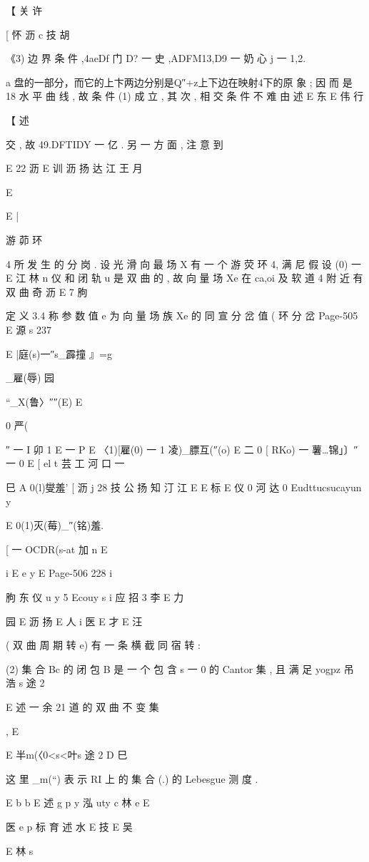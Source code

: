 {{{{{{【 关 许

[ 怀 沥 c 技 胡

《3) 边 界 条 件 ,4aeDf 门 D? 一 史 ,ADFM13,D9 一 奶 心 j 一 1,2.

a
盘的一部分，而它的上卞两边分别是Q″+z上下边在映射4下的原
象 ; 因 而 是 18 水 平 曲 线 , 故 条 件 (1) 成 立 , 其 次 , 相 交 条 件 不 难 由 述
E 东 E 伟 行

【 述

交 , 故 49.DFTIDY 一 亿 . 另 一 方 面 , 注 意 到

E 22 沥
E 训 沥 扬 达 江 王 月

E

E |

游 茆 环

4
所 发 生 的 分 岗 . 设 光 滑 向 最 场 X 有 一 个 游 荧 环 4, 满 尼 假 设 (0) 一
E 江 林 n 仪
和 闭 轨 u 是 双 曲 的 , 故 向 量 场 Xe 在 ca,oi 及 软 道 4 附 近 有 双 曲 奇
沥
E 7 朐

定 义 3.4 称 参 数 值 e 为 向 量 场 族 Xe 的 同 宣 分 岔 值 ( 环 分 岔
Page-505
E 源 s 237

E |庭(s)一″s_霹撞 』=g

_雇(辱) 园

“_X(鲁〉″″(E) E

0
严(

″ 一 I 卯 1
E 一 P E
〈1)[雇(0) 一 1 凌)_膘互(″(o) E
二 0 [ RKo) 一 薯…锦」〕″ 一 0
E
[ el t
芸 工 河 口 一

巳 A 0(l)燮羞' [ 沥
j 28 技 公 扬 知 汀 江
E
E 标
E 仪 0 河 达 0
Eudttucsucayun y

E 0(1)灭(莓)_″(铭)羞.

[
一 OCDR(s-at 加 n
E

i
E e y
E
Page-506
228 i

朐 东 仪 u y 5
Ecouy s i 应 招 3 李
E 力

园
E
沥 扬
E 人
i
医
E 才
E 汪

( 双 曲 周 期 转 e) 有 一 条 横 截 同 宿 转 :

(2) 集 合 Bc 的 闭 包 B 是 一 个 包 含 s 一 0 的 Cantor 集 , 且 满 足
yogpz 吊 浩 s 途 2

E 述 一 余 21
道 的 双 曲 不 变 集 } ,
E

E 半m(〈0<s<叶s 途 2
D 巳

这 里 _m(“) 表 示 RI 上 的 集 合 (.) 的 Lebesgue 测 度 .

E b b
E 述 g p y 泓
uty c 林 e
E

医 e p 标 育 述 水 E 技
E 吴

E 林 s

}}}}}
